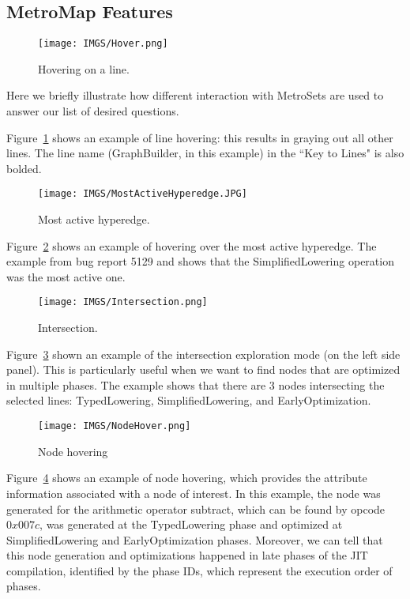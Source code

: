 \documentclass[runningheads]{llncs}
\begin{document}
\begin{appendices}
\section{MetroMap Features}\label{sec:mapfeatures}

\begin{figure}[h]
    \texttt{[image: IMGS/Hover.png]}
    \caption{Hovering on a line.}
    \label{fig:linehovering}
\end{figure}

Here we briefly illustrate how different interaction with MetroSets are used to answer our list of desired questions. 

Figure~\ref{fig:linehovering} shows an example of line hovering: this results in graying out all other lines. The line name (GraphBuilder, in this example) in the ``Key to Lines" is also bolded.

\begin{figure}[hbt!]
    \texttt{[image: IMGS/MostActiveHyperedge.JPG]}
    \caption{Most active hyperedge.}
    \label{fig:mostactivehyperedge}
\end{figure}

Figure~\ref{fig:mostactivehyperedge} shows an example of hovering over the most active hyperedge.
The example from bug report 5129 and shows that the SimplifiedLowering operation was the most active one.

\begin{figure}
    \texttt{[image: IMGS/Intersection.png]}
    \caption{Intersection.}
    \label{fig:intersection}
\end{figure}

Figure~\ref{fig:intersection} shown an example of the intersection exploration mode (on the left side panel). This is particularly useful when we want to find nodes that are optimized in multiple phases. The example shows that there are 3 nodes intersecting the selected lines: TypedLowering, SimplifiedLowering, and EarlyOptimization.

\begin{figure}
    \texttt{[image: IMGS/NodeHover.png]}
    \caption{Node hovering}
    \label{fig:nodehover}
\end{figure}

Figure~\ref{fig:nodehover} shows an example of node hovering, which provides the attribute information associated with a node of interest. In this example, the node was generated for the arithmetic operator subtract, which can be found by  opcode $0x007c$, was generated at the TypedLowering phase and optimized at SimplifiedLowering and EarlyOptimization phases. Moreover, we can tell that this node generation and optimizations happened in late phases of the JIT compilation, identified by the phase IDs, which represent the execution order of phases.
\end{appendices}
\end{document}

